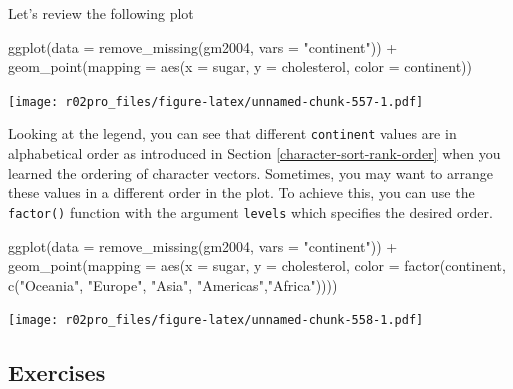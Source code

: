 \documentclass[
]{book}
\newenvironment{Shaded}{\begin{snugshade}}{\end{snugshade}}
\newcommand{\AttributeTok}[1]{\textcolor[rgb]{0.77,0.63,0.00}{#1}}
\newcommand{\FunctionTok}[1]{\textcolor[rgb]{0.00,0.00,0.00}{#1}}
\newcommand{\NormalTok}[1]{#1}
\newcommand{\SpecialCharTok}[1]{\textcolor[rgb]{0.00,0.00,0.00}{#1}}
\newcommand{\StringTok}[1]{\textcolor[rgb]{0.31,0.60,0.02}{#1}}
\begin{document}
Let's review the following plot

\begin{Shaded}
\begin{Highlighting}[]
\FunctionTok{ggplot}\NormalTok{(}\AttributeTok{data =} \FunctionTok{remove\_missing}\NormalTok{(gm2004, }\AttributeTok{vars =} \StringTok{"continent"}\NormalTok{)) }\SpecialCharTok{+} 
  \FunctionTok{geom\_point}\NormalTok{(}\AttributeTok{mapping =} \FunctionTok{aes}\NormalTok{(}\AttributeTok{x =}\NormalTok{ sugar, }
                           \AttributeTok{y =}\NormalTok{ cholesterol,}
                           \AttributeTok{color =}\NormalTok{ continent))}
\end{Highlighting}
\end{Shaded}

\texttt{[image: r02pro\_files/figure-latex/unnamed-chunk-557-1.pdf]}

Looking at the legend, you can see that different \texttt{continent} values are in alphabetical order as introduced in Section \ref{character-sort-rank-order} when you learned the ordering of character vectors. Sometimes, you may want to arrange these values in a different order in the plot. To achieve this, you can use the \texttt{factor()} function with the argument \texttt{levels} which specifies the desired order.

\begin{Shaded}
\begin{Highlighting}[]
\FunctionTok{ggplot}\NormalTok{(}\AttributeTok{data =} \FunctionTok{remove\_missing}\NormalTok{(gm2004, }\AttributeTok{vars =} \StringTok{"continent"}\NormalTok{)) }\SpecialCharTok{+} 
  \FunctionTok{geom\_point}\NormalTok{(}\AttributeTok{mapping =} \FunctionTok{aes}\NormalTok{(}\AttributeTok{x =}\NormalTok{ sugar, }
                           \AttributeTok{y =}\NormalTok{ cholesterol,}
                           \AttributeTok{color =} \FunctionTok{factor}\NormalTok{(continent,}
                                          \FunctionTok{c}\NormalTok{(}\StringTok{"Oceania"}\NormalTok{, }\StringTok{"Europe"}\NormalTok{, }\StringTok{"Asia"}\NormalTok{, }\StringTok{"Americas"}\NormalTok{,}\StringTok{"Africa"}\NormalTok{))))}
\end{Highlighting}
\end{Shaded}

\texttt{[image: r02pro\_files/figure-latex/unnamed-chunk-558-1.pdf]}

\hypertarget{exercises-33}{%
\subsection{Exercises}\label{exercises-33}}
\end{document}
